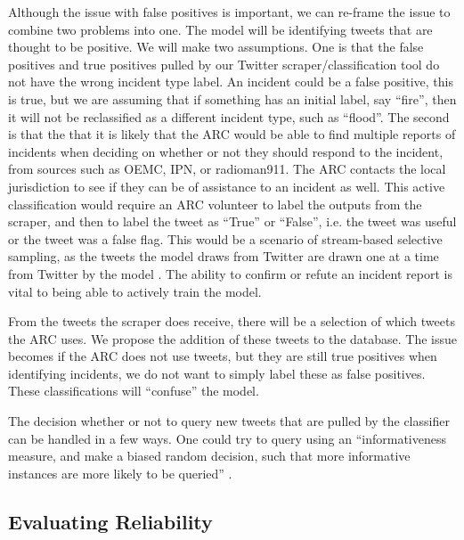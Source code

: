 \documentclass[titlepage, 12pt]{article}
\begin{document}
Although the issue with false positives is important, we can re-frame the issue to combine two problems into one. The model will be identifying tweets that are thought to be positive. We will make two assumptions. One is that the false positives and true positives pulled by our Twitter scraper/classification tool do not have the wrong incident type label. An incident could be a false positive, this is true, but we are assuming that if something has an initial label, say ``fire'', then it will not be reclassified as a different incident type, such as ``flood''. The second is that the  that it is likely that the ARC would be able to find multiple reports of incidents when deciding on whether or not they should respond to the incident, from sources such as OEMC, IPN, or radioman911. The ARC contacts the local jurisdiction to see if they can be of assistance to an incident as well. This active classification would require an ARC volunteer to label the outputs from the scraper, and then to label the tweet as ``True'' or ``False'', i.e. the tweet was useful or the tweet was a false flag. This would be a scenario of stream-based selective sampling, as the tweets the model draws from Twitter are drawn one at a time from Twitter by the model \citep{settles.tr09}. The ability to confirm or refute an incident report is vital to being able to actively train the model.

From the tweets the scraper does receive, there will be a selection of which tweets the ARC uses. We propose the addition of these tweets to the database. The issue becomes if the ARC does not use tweets, but they are still true positives when identifying incidents, we do not want to simply label these as false positives. These classifications will ``confuse'' the model.

The decision whether or not to query new tweets that are pulled by the classifier can be handled in a few ways. One could try to query using an ``informativeness measure, and make a biased random decision, such that more informative instances are more likely to be queried'' \citep{settles.tr09}.

\subsection{Evaluating Reliability}
\end{document}
